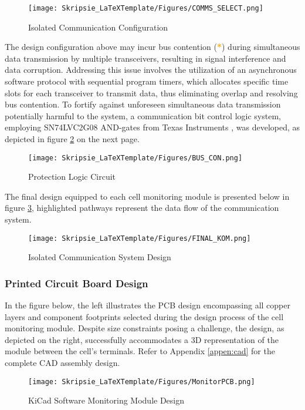 \begin{figure}[h!]
\centering
\texttt{[image: Skripsie\_LaTeXTemplate/Figures/COMMS\_SELECT.png]}
\caption{Isolated Communication Configuration}
\label{fig:MM_D2}
\end{figure}
\noindent
The design configuration above may incur bus contention (\textcolor{orange}{\textbf{*}}) during simultaneous data transmission by multiple transceivers, resulting in signal interference and data corruption. Addressing this issue involves the utilization of an asynchronous software protocol with sequential program timers, which allocates specific time slots for each transceiver to transmit data, thus eliminating overlap and resolving bus contention. To fortify against unforeseen simultaneous data transmission potentially harmful to the system, a communication bit control logic system, employing SN74LVC2G08 AND-gates from Texas Instruments \cite{isooooCHIP}, was developed, as depicted in figure \ref{fig:buscon} on the next page.\newpage
\begin{figure}[h!]
\centering
\texttt{[image: Skripsie\_LaTeXTemplate/Figures/BUS\_CON.png]}
\caption{Protection Logic Circuit}
\label{fig:buscon}
\end{figure}
\noindent
The final design equipped to each cell monitoring module is presented below in figure \ref{fig:klakom}, highlighted pathways represent the data flow of the communication system.

\begin{figure}[h!]
\centering
\texttt{[image: Skripsie\_LaTeXTemplate/Figures/FINAL\_KOM.png]}
\caption{Isolated Communication System Design}
\label{fig:klakom}
\end{figure}
\subsubsection{Printed Circuit Board Design}\label{subsec:mmmm3}
In the figure below, the left illustrates the PCB design encompassing all copper layers and component footprints selected during the design process of the cell monitoring module. Despite size constraints posing a challenge, the design, as depicted on the right, successfully accommodates a 3D representation of the module between the cell's terminals. Refer to Appendix \ref{appen:cad} for the complete CAD assembly design.

\begin{figure}[h!]
\centering
\texttt{[image: Skripsie\_LaTeXTemplate/Figures/MonitorPCB.png]}
\caption{KiCad Software Monitoring Module Design \cite{ki}}
\label{fig:Monitoring_Board_PCB_2D}
\end{figure}
\newpage
